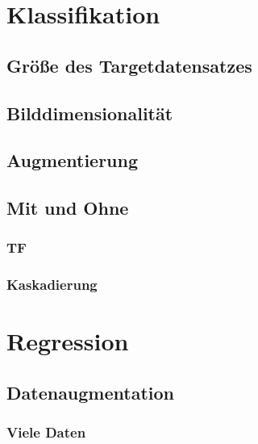 \documentclass[ngerman]{report}
\begin{document}
    \chapter{Klassifikation}  %
    
    \section{Größe des Targetdatensatzes}
    
    \section{Bilddimensionalität}
    
    \section{Augmentierung}
    
    \section{Mit und Ohne}
    \subsection{TF}
    
    \subsection{Kaskadierung}
    


    \chapter{Regression}  %
    
    \section{Datenaugmentation}
    
    \subsection{Viele Daten}
    
\end{document}
